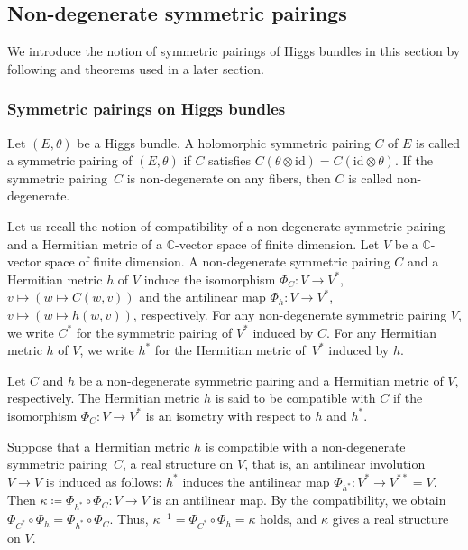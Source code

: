 \documentclass[10pt,a4paper]{amsart}
\numberwithin{equation}{section}
\newcommand{\C}{\mathbb{C}}
\newcommand{\id}{\mathrm{id}}
\begin{document}
\subsection{Non-degenerate symmetric pairings}
We introduce the notion of symmetric pairings of Higgs bundles in this section by following \cite{LM1} and theorems used in a later section.
\subsubsection{Symmetric pairings on Higgs bundles}
\begin{Definition}
 Let $(E,\theta)$ be a Higgs bundle. A holomorphic symmetric pairing $C$ of $E$ is called a symmetric pairing of $(E,\theta)$ if $C$ satisfies $C(\theta\otimes\id)= C(\id\otimes\theta)$. If the symmetric pairing~$C$ is non-degenerate on any fibers, then $C$ is called non-degenerate.
\end{Definition}

Let us recall the notion of compatibility of a non-degenerate symmetric pairing and a Hermitian metric of a $\C$-vector space of finite dimension. Let $V$ be a $\C$-vector space of finite dimension. A non-degenerate symmetric pairing $C$ and a Hermitian metric $h$ of $V$ induce the isomorphism $\Phi_C\colon V\to V^{*}$, $v\mapsto (w\mapsto C(w,v))$ and the antilinear map $\Phi_h\colon V\to V^{*}$, $v\mapsto (w\mapsto h(w,v))$, respectively. For any non-degenerate symmetric pairing $V$, we write $C^{*}$ for the symmetric pairing of $V^{*}$ induced by $C$. For any Hermitian metric $h$ of $V$, we write $h^{*}$ for the Hermitian metric of~$V^{*}$ induced by $h$.
\begin{Definition}
 Let $C$ and $h$ be a non-degenerate symmetric pairing and a Hermitian metric of $V$, respectively. The Hermitian metric $h$ is said to be compatible with $C$ if the isomorphism $\Phi_C\colon V\to V^{*}$ is an isometry with respect to $h$ and $h^{*}$.
\end{Definition}
Suppose that a Hermitian metric $h$ is compatible with a non-degenerate symmetric pairing~$C$, a real structure on $V$, that is, an antilinear involution $V\to V$ is induced as follows: $h^{*}$ induces the antilinear map $\Phi_{h^{*}}\colon V^{*}\to V^{**}=V$. Then $\kappa \coloneqq \Phi_{h^{*}}\circ \Phi_{C}\colon V\to V$ is an antilinear map. By the compatibility, we obtain $\Phi_{C^*}\circ \Phi_{h} = \Phi_{h^*}\circ \Phi_{C}$. Thus, ${\kappa}^{-1} = \Phi_{C^*}\circ \Phi_{h} = \kappa$ holds, and $\kappa$ gives a real structure on $V$.
\end{document}
